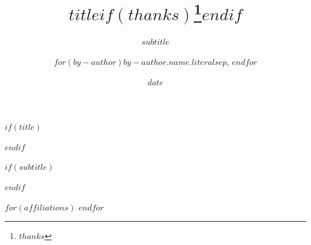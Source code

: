$if(title)$
\title{$title$$if(thanks)$\thanks{$thanks$}$endif$}
$endif$

$if(subtitle)$
\subtitle{$subtitle$}
$endif$

\author{$for(by-author)$$by-author.name.literal$$sep$, $endfor$}
$for(affiliations)$
$endfor$

\date{$date$}

\usepackage{xcolor}
\hypersetup{
  colorlinks = true,
  linkcolor  = mylinkcolor,
  citecolor  = mylinkcolor,
  urlcolor   = mylinkcolor
}

